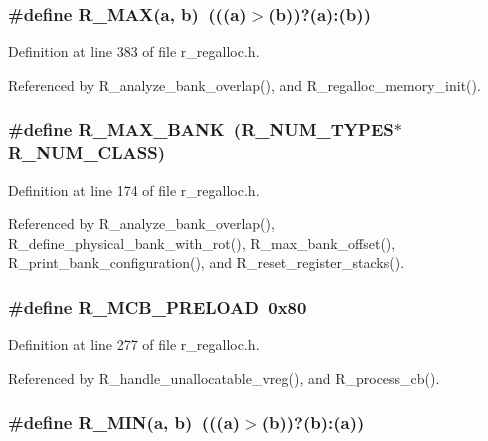 \subsubsection{\setlength{\rightskip}{0pt plus 5cm}\#define R\_\-MAX(a, b)~(((a)$>$(b))?(a):(b))}\label{r__regalloc_8h_e2c354a09eac9d246070a1e82797c44c}




Definition at line 383 of file r\_\-regalloc.h.

Referenced by R\_\-analyze\_\-bank\_\-overlap(), and R\_\-regalloc\_\-memory\_\-init().
\subsubsection{\setlength{\rightskip}{0pt plus 5cm}\#define R\_\-MAX\_\-BANK~(R\_\-NUM\_\-TYPES$\ast$R\_\-NUM\_\-CLASS)}\label{r__regalloc_8h_c2e5aad226c2723cad642ac4f608c658}




Definition at line 174 of file r\_\-regalloc.h.

Referenced by R\_\-analyze\_\-bank\_\-overlap(), R\_\-define\_\-physical\_\-bank\_\-with\_\-rot(), R\_\-max\_\-bank\_\-offset(), R\_\-print\_\-bank\_\-configuration(), and R\_\-reset\_\-register\_\-stacks().
\subsubsection{\setlength{\rightskip}{0pt plus 5cm}\#define R\_\-MCB\_\-PRELOAD~0x80}\label{r__regalloc_8h_6e8e323f6e7901a0cba59593f8721d54}




Definition at line 277 of file r\_\-regalloc.h.

Referenced by R\_\-handle\_\-unallocatable\_\-vreg(), and R\_\-process\_\-cb().
\subsubsection{\setlength{\rightskip}{0pt plus 5cm}\#define R\_\-MIN(a, b)~(((a)$>$(b))?(b):(a))}\label{r__regalloc_8h_9142e8147a0eefc0dbe99863977f3213}




